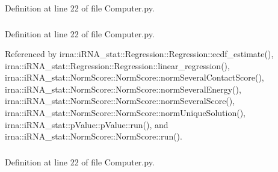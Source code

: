 \-Definition at line 22 of file \-Computer.\-py.

\hypertarget{classirna_1_1iRNA__stat_1_1Computer_1_1Computer_a93ac0f6a0d0d8378299df5ee5e084682}{
\subsubsection[{norm\-\_\-score}]{}}
\label{classirna_1_1iRNA__stat_1_1Computer_1_1Computer_a93ac0f6a0d0d8378299df5ee5e084682}


\-Definition at line 22 of file \-Computer.\-py.



\-Referenced by irna\-::i\-R\-N\-A\-\_\-stat\-::\-Regression\-::\-Regression\-::ecdf\-\_\-estimate(), irna\-::i\-R\-N\-A\-\_\-stat\-::\-Regression\-::\-Regression\-::linear\-\_\-regression(), irna\-::i\-R\-N\-A\-\_\-stat\-::\-Norm\-Score\-::\-Norm\-Score\-::norm\-Several\-Contact\-Score(), irna\-::i\-R\-N\-A\-\_\-stat\-::\-Norm\-Score\-::\-Norm\-Score\-::norm\-Several\-Energy(), irna\-::i\-R\-N\-A\-\_\-stat\-::\-Norm\-Score\-::\-Norm\-Score\-::norm\-Several\-Score(), irna\-::i\-R\-N\-A\-\_\-stat\-::\-Norm\-Score\-::\-Norm\-Score\-::norm\-Unique\-Solution(), irna\-::i\-R\-N\-A\-\_\-stat\-::p\-Value\-::p\-Value\-::run(), and irna\-::i\-R\-N\-A\-\_\-stat\-::\-Norm\-Score\-::\-Norm\-Score\-::run().

\hypertarget{classirna_1_1iRNA__stat_1_1Computer_1_1Computer_a4ec2a08417b8783bbeeb7bdfee66fd04}{
\subsubsection[{numsoft}]{}}
\label{classirna_1_1iRNA__stat_1_1Computer_1_1Computer_a4ec2a08417b8783bbeeb7bdfee66fd04}


\-Definition at line 22 of file \-Computer.\-py.

